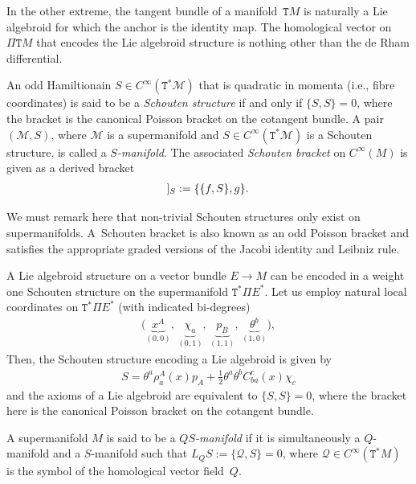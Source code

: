 \documentclass[10pt,a4paper]{amsart}
\newcommand{\Dleft}{[\hspace{-1.5pt}[}
\newcommand{\Dright}{]\hspace{-1.5pt}]}
\newcommand{\SN}[1]{\Dleft #1 \Dright}
\def\sT{{\mathtt T}}
\numberwithin{equation}{section}
\begin{document}
\begin{Example}
In the other extreme, the tangent bundle of a manifold~$\sT M$ is naturally a Lie algebroid  for which the anchor is the identity map. The homological vector on $\Pi \sT M$ that encodes the Lie algebroid structure is nothing other than the de Rham dif\/ferential.
\end{Example}


\begin{Definition}
 An odd Hamiltionain $S \in C^{\infty}(\sT^{*}\mathcal{M})$  that is quadratic in momenta (i.e., f\/ibre coordinates) is said to be a \emph{Schouten structure} if and only if $\{S,S\} = 0$, where the bracket is the canonical Poisson bracket on the cotangent bundle. A pair $(\mathcal{M},S)$, where $\mathcal{M}$ is a supermanifold and $S \in C^{\infty}(\sT^{*}{\mathcal M})$ is a Schouten structure, is called a \emph{$S$-manifold}.  The associated \emph{Schouten bracket} on $C^{\infty}(M)$ is given  as a derived bracket
\begin{gather*}
\SN{f,g}_{S} :=  \{\{f, S\},g \}.
\end{gather*}
\end{Definition}

We must remark here that non-trivial Schouten structures only exist on supermanifolds. A~Schouten bracket is also known as an odd Poisson bracket and satisf\/ies the appropriate graded versions of the Jacobi identity and Leibniz rule.


\begin{Example}
A Lie algebroid structure on a vector bundle $E \rightarrow M$ can be encoded in a weight one  Schouten structure on the supermanifold $\sT^{*}\Pi E^{*}$. Let us employ natural local coordinates  on $\sT^{*}\Pi E^{*}$ (with indicated bi-degrees)
\begin{gather*}
\big(\underbrace{x^{A}}_{(0,0)}, \, \underbrace{\chi_{a}}_{(0,1)}, \, \underbrace{p_{B}}_{(1,1)}, \, \underbrace{\theta^{b}}_{(1,0)}\big) ,
\end{gather*}
Then, the Schouten structure encoding a Lie algebroid is given by
\begin{gather*}
S = \theta^{a}\rho_{a}^{A}(x) p_{A} + \frac{1}{2}\theta^{a}\theta^{b}C_{ba}^{c}(x) \chi_{c}
\end{gather*}
and the axioms of a Lie algebroid are equivalent to $\{ S,S\} =0$, where the bracket here is the canonical Poisson bracket on the cotangent bundle.
\end{Example}


\begin{Definition}
A supermanifold $M$ is said to be a \emph{$QS$-manifold} if it is simultaneously a $Q$-manifold and a $S$-manifold such that $L_{Q}S := \{\mathcal{Q}, S \} =0$, where $\mathcal{Q} \in C^{\infty}(\sT^{*}M)$ is the symbol of the homological vector f\/ield~$Q$.
\end{Definition}
\end{document}
